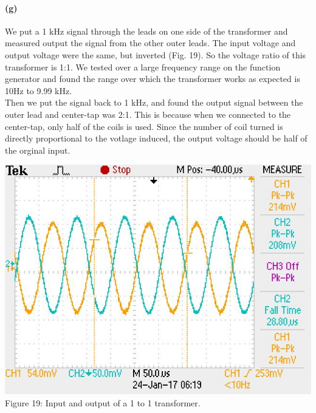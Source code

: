 \documentclass[]{article}
\begin{document}
	\paragraph{ (g)}
We put a 1 kHz signal through the leads on one side of the transformer and measured output the signal from the other outer leads. The input voltage and output voltage were the same, but inverted (Fig. 19). So the voltage ratio of this transformer is 1:1. We tested over a large frequency range on the function generator and found the range over which the transformer works as expected is 10Hz to 9.99 kHz. \\ 
Then we put the signal back to 1 kHz, and found the output signal between the outer lead and center-tap was 2:1. This is because when we connected to the center-tap, only half of the coils is used. Since the number of coil turned is directly proportional to the votlage induced, the output voltage should be half of the orginal input.
	\begin{center}
		\includegraphics[scale=0.3]{g_1to1}\\
		Figure 19: Input and output of a 1 to 1 transformer.
	\end{center}
\end{document}
